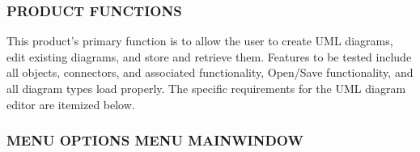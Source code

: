\documentclass[twoside,letterpaper]{article}
\begin{document}
\subsubsection[PRODUCT FUNCTIONS]
{\bfseries PRODUCT FUNCTIONS}

This product's primary function is to allow the user to create UML diagrams, edit existing diagrams, and store and retrieve them.
\newline Features to be tested include all objects, connectors, and associated functionality, Open/Save functionality, and all diagram types load properly. The specific requirements for the UML diagram editor are itemized below.

\bigskip

\subsubsection[MENU OPTIONS MENU MAINWINDOW]
{\bfseries MENU OPTIONS MENU MAINWINDOW} 
\end{document}
